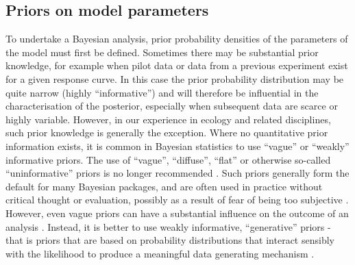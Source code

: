 \documentclass[
  shortnames]{jss}
\begin{document}
\newpage

\hypertarget{priors-on-model-parameters}{%
\subsection{Priors on model parameters}\label{priors-on-model-parameters}}

To undertake a Bayesian analysis, prior probability densities of the parameters of the model must first be defined. Sometimes there may be substantial prior knowledge, for example when pilot data or data from a previous experiment exist for a given response curve. In this case the prior probability distribution may be quite narrow (highly ``informative'') and will therefore be influential in the characterisation of the posterior, especially when subsequent data are scarce or highly variable. However, in our experience in ecology and related disciplines, such prior knowledge is generally the exception. Where no quantitative prior information exists, it is common in Bayesian statistics to use ``vague'' or ``weakly'' informative priors. The use of ``vague'', ``diffuse'', ``flat'' or otherwise so-called ``uninformative'' priors is no longer recommended \citep{Banner2020}. Such priors generally form the default for many Bayesian packages, and are often used in practice without critical thought or evaluation, possibly as a result of fear of being too subjective \citep{Banner2020}. However, even vague priors can have a substantial influence on the outcome of an analysis \citep{depaoli2020importance, gelman2017entropy}. Instead, it is better to use weakly informative, ``generative'' priors - that is priors that are based on probability distributions that interact sensibly with the likelihood to produce a meaningful data generating mechanism \citep{gelman2017entropy}.
\end{document}
